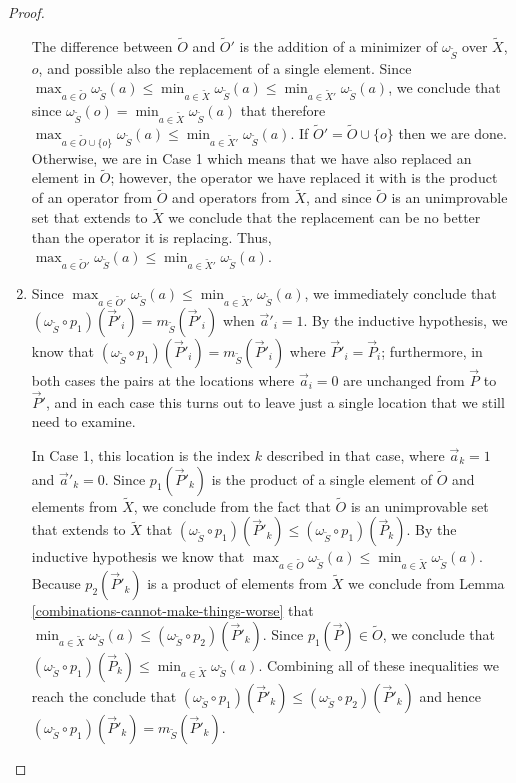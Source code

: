\documentclass[12pt]{amsbook}
\theoremstyle{plain}
\theoremstyle{definition}
\theoremstyle{remark}
\newcommand{\lst}{\vec}
\newcommand{\set}{\tilde}
\newcommand{\om}{\omega}
\begin{document}
\begin{proof}
\begin{enumerate}
The difference between $\set O$ and $\set O'$ is the addition of a minimizer of $\om_{\set S}$ over $\set X$, $o$, and possible also the replacement of a single element.  Since $\max_{a\in\set O}\om_{\set S}(a)\le\min_{a\in\set X}\om_{\set S}(a)\le\min_{a\in\set X'}\om_{\set S}(a)$, we conclude that since $\om_{\set S}(o)=\min_{a\in\set X}\om_{\set S}(a)$ that therefore $\max_{a\in\set O\cup\{o\}}\om_{\set S}(a)\le\min_{a\in\set X'}\om_{\set S}(a)$.  If $\set O'=\set O\cup\{o\}$ then we are done.  Otherwise, we are in Case 1 which means that we have also replaced an element in $\set O$;  however, the operator we have replaced it with is the product of an operator from $\set O$ and operators from $\set X$, and since $\set O$ is an unimprovable set that extends to $\set X$ we conclude that the replacement can be no better than the operator it is replacing.  Thus, $\max_{a\in\set O'}\om_{\set S}(a)\le\min_{a\in\set X'}\om_{\set S}(a)$.
\item

Since $\max_{a\in\set O'}\om_{\set S}(a)\le\min_{a\in\set X'}\om_{\set S}(a)$, we immediately conclude that $(\om_{\set S}\circ p_1)(\lst P'_i)=m_{\set S}(\lst P'_i)$ when $\lst a'_i=1$.  By the inductive hypothesis, we know that $(\om_{\set S}\circ p_1)(\lst P'_i)=m_{\set S}(\lst P'_i)$ where $\lst P'_i=\lst P_i$;  furthermore, in both cases the pairs at the locations where $\lst a_i=0$ are unchanged from $\lst P$ to $\lst P'$, and in each case this turns out to leave just a single location that we still need to examine.

In Case 1, this location is the index $k$ described in that case, where $\lst a_k=1$ and $\lst a'_k=0$.  Since $p_1(\lst P'_k)$ is the product of a single element of $\set O$ and elements from $\set X$, we conclude from the fact that $\set O$ is an unimprovable set that extends to $\set X$ that $(\om_{\set S}\circ p_1)(\lst P'_k)\le(\om_{\set S}\circ p_1)(\lst P_k)$.  By the inductive hypothesis we know that $\max_{a\in\set O}\om_{\set S}(a)\le\min_{a\in\set X}\om_{\set S}(a)$.  Because $p_2(\lst P'_k)$ is a product of elements from $\set X$ we conclude from Lemma \ref{combinations-cannot-make-things-worse} that $\min_{a\in\set X}\om_{\set S}(a)\le (\om_{\set S}\circ p_2)(\lst P'_k)$.  Since $p_1(\lst P)\in\set O$, we conclude that $(\om_{\set S}\circ p_1)(\lst P_k)\le\min_{a\in\set X}\om_{\set S}(a)$.  Combining all of these inequalities we reach the conclude that $(\om_{\set S}\circ p_1)(\lst P'_k)\le(\om_{\set S}\circ p_2)(\lst P'_k)$ and hence $(\om_{\set S}\circ p_1)(\lst P'_k)=m_{\set S}(\lst P'_k)$.


\end{enumerate}
\end{proof}
\end{document}
